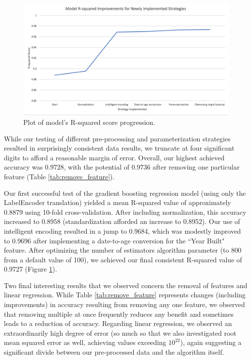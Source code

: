 \documentclass[letterpaper]{article}
\begin{document}
\begin{figure}
\begin{center}
\includegraphics[width=\textwidth]{Figure.png}
\end{center}
\caption{Plot of model's R-squared score progression.}
\label{fig:results}
\end{figure}

While our testing of different pre-processing and parameterization strategies resulted in surprisingly consistent data results, we truncate at four significant digits to afford a reasonable margin of error.  Overall, our highest achieved accuracy was 0.9728, with the potential of 0.9736 after removing one particular feature (Table \ref{tab:remove_feature}).

Our first successful test of the gradient boosting regression model (using only the LabelEncoder translation) yielded a mean R-squared value of approximately 0.8879 using 10-fold cross-validation.  After including normalization, this accuracy increased to 0.8958 (standardization afforded an increase to 0.8952).  Our use of intelligent encoding resulted in a jump to 0.9684, which was modestly improved to 0.9696 after implementing a date-to-age conversion for the ``Year Built" feature.  After optimizing the number of estimators algorithm parameter (to 800 from a default value of 100), we achieved our final consistent R-squared value of 0.9727 (Figure \ref{fig:results}).

Two final interesting results that we observed concern the removal of features and linear regression.  While Table \ref{tab:remove_feature} represents changes (including improvements) in accuracy resulting from removing any one feature, we observed that removing multiple at once frequently reduces any benefit and sometimes leads to a reduction of accuracy.  Regarding linear regression, we observed an extraordinarily high degree of error (so much so that we also investigated root mean squared error as well, achieving values exceeding ${10^{22}}$), again suggesting a significant divide between our pre-processed data and the algorithm itself.
\end{document}
